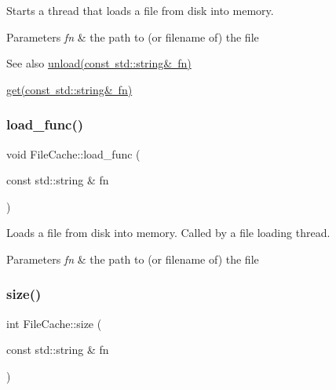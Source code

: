Starts a thread that loads a file from disk into memory. 


\begin{DoxyParams}{Parameters}
{\em fn} & the path to (or filename of) the file \\
\hline
\end{DoxyParams}
\begin{DoxySeeAlso}{See also}
\mbox{\hyperlink{classsage_1_1FileCache_a902a36451f11c4b6e4267358bfadb024}{unload(const std\+::string\& fn)}} 

\mbox{\hyperlink{classsage_1_1FileCache_a67fe1af6ccb8d06b7e97dc54a1836eee}{get(const std\+::string\& fn)}} 
\end{DoxySeeAlso}
\mbox{\label{classsage_1_1FileCache_a991e5569482a4f6f864dd9854c4524d0}} 
\subsubsection{\texorpdfstring{load\_func()}{load\_func()}}
{\footnotesize\ttfamily void File\+Cache\+::load\+\_\+func (\begin{DoxyParamCaption}\item[{const std\+::string \&}]{fn }\end{DoxyParamCaption})\hspace{0.3cm}{\ttfamily [private]}}



Loads a file from disk into memory. Called by a file loading thread. 


\begin{DoxyParams}{Parameters}
{\em fn} & the path to (or filename of) the file \\
\hline
\end{DoxyParams}
\mbox{\label{classsage_1_1FileCache_a369b86f1fb585e5ce5142a7f1f22e38c}} 
\subsubsection{\texorpdfstring{size()}{size()}}
{\footnotesize\ttfamily int File\+Cache\+::size (\begin{DoxyParamCaption}\item[{const std\+::string \&}]{fn }\end{DoxyParamCaption})}



